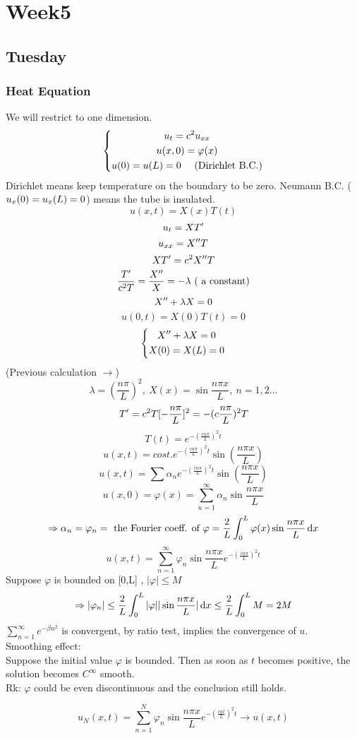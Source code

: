 
\chapter{Week5}
\section{Tuesday}
\subsection{Heat Equation}
We will restrict to one dimension.
\[\left\{\begin{gathered}u_{t}=c^2u_{xx}\\u(x,0)=\varphi(x)\\u(0)=u(L)=0 \quad \text{ (Dirichlet B.C.)}\end{gathered}\right.
\]
Dirichlet means keep temperature on the boundary to be zero. Neumann B.C. ( $u_x (0)=u_x(L)=0$) means the tube is insulated.
\[u(x,t)=X(x)T(t)
\]
\[u_{t}=XT^{\prime}
\]
\[u_{xx}=X^{\prime\prime} T 
\]
\[XT^{\prime}=c^2X^{\prime\prime} T
\]
\[\frac{T^{\prime}}{c^2T}=\frac{X^{\prime\prime}}{X}=-\lambda ~(\text{ a constant})
\]
\[X^{\prime\prime}+\lambda X=0
\]
\[u(0,t)=X(0)T(t)=0
\]
\[\left\{\begin{gathered}X^{\prime\prime}+\lambda X=0\\X(0)=X(L)=0\end{gathered}\right.
\]
(Previous calculation $\rightarrow$)
\[\lambda=(\frac{n\pi}{L})^2,~ X(x)=\sin\frac{n\pi x}{L},~n=1,2\dots
\]
\[T^{\prime}=c^2T[-\frac{n\pi }{L}]^2=-(c\frac{n\pi }{L})^2T
\]
\[T(t)=e^{-(\frac{cn\pi }{L})^2t}
\]
\[u(x,t)=cost. e^{-(\frac{cn\pi }{L})^2t}\sin(\frac{n\pi x}{L})
\]
\[u(x,t)=\sum\alpha_n e^{-(\frac{cn\pi}{L})^2t}\sin(\frac{n\pi x}{L})
\]
\[u(x,0)=\varphi(x)=\sum_{n=1}^\infty \alpha_n\sin\frac{n\pi x}{L}
\]
\[\Rightarrow \alpha_n=\varphi_n= \text{ the Fourier coeff. of } \varphi=\frac{2}{L}\int_0^L\varphi(x)\sin\frac{n\pi x}{L}\,\mathrm{d} x
\]
\[u(x,t)=\sum_{n=1}^\infty \varphi_n\sin \frac{n\pi x}{L}e^{-(\frac{cn\pi }{L})^2t}
\]
Suppose $\varphi$ is bounded on [0,L] , $|\varphi|\leq M$
\[\Rightarrow |\varphi_n|\leq\frac{2}{L}\int_0^L|\varphi||\sin\frac{n\pi x}{L}|\,\mathrm{d} x\leq\frac{2}{L}\int_0^L M=2M
\]
$\sum_{n=1}^\infty e^{-\beta n^2}$ is convergent, by ratio test, implies the convergence of $u$.\\
Smoothing effect:\\
Suppose the initial value $\varphi$ is bounded. Then as soon as $t$ becomes positive, the solution becomes $C^\infty$ smooth.\\
Rk: $\varphi$ could be even discontinuous and the conclusion still holds.

\[u_N(x,t)=\sum_{n=1}^N\varphi_n\sin\frac{n\pi x}{L}e^{-(\frac{cnt}{L})^2t}\rightarrow u(x,t) 
\]

